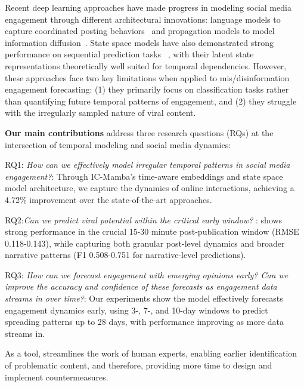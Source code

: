 Recent deep learning approaches have made progress in modeling social media engagement through different architectural innovations: language models to capture coordinated posting behaviors~\citep{atanasov2019predicting,tian2021rumour,tian2022duck,tian2023metatroll} and propagation models to model information
diffusion~\citep{zannettou2019disinformation,im2020still,luceri2024unmasking,kong2023interval,Kong2021,Kong2020,Kong2020a,Zhang2019,Kong2018}. 
State space models have also demonstrated strong performance on sequential prediction tasks ~\citep{mamba,mamba2}, with their latent state representations theoretically well suited for temporal dependencies. 
However, these approaches face two key limitations when applied to mis/disinformation engagement forecasting: 
(1) they primarily focus on classification tasks rather than quantifying future temporal patterns of engagement, and 
(2) they struggle with the irregularly sampled nature of viral content.


\noindent\textbf{Our main contributions} address three research questions (RQs) at the intersection of temporal modeling and social media dynamics:

RQ1: \textit{How can we effectively model irregular temporal patterns in social media engagement?}: Through IC-Mamba's time-aware embeddings and state space model architecture, we capture the dynamics of online interactions, achieving a 4.72\% improvement over the state-of-the-art approaches. 

RQ2:\textit{Can we predict viral potential within the critical early window? }: \icmamba shows strong performance in the crucial 15-30 minute post-publication window (RMSE 0.118-0.143), while capturing both granular post-level dynamics and broader narrative patterns (F1 0.508-0.751 for narrative-level predictions).

RQ3: \textit{How can we forecast engagement with emerging opinions early? Can we improve the accuracy and confidence of these forecasts as engagement data streams in over time?}: Our experiments show the model effectively forecasts engagement dynamics early, using 3-, 7-, and 10-day windows to predict spreading patterns up to 28 days, with performance improving as more data streams in. %

As a tool, \icmamba streamlines the work of human experts, enabling earlier identification of problematic content, and therefore, providing more time to design and implement countermeasures.

